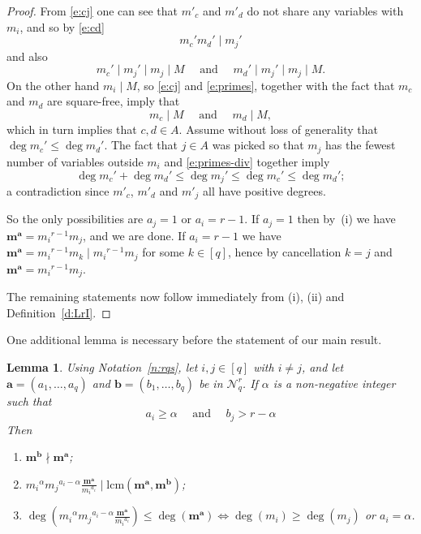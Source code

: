 \documentclass[11pt]{article}
\newtheorem{lemm}[theo]{Lemma}
\theoremstyle{definition}
\numberwithin{equation}{section}
\newcommand{\Nrq}{\mathcal{N}^r_q}
\newcommand{\lcm}{\mathrm{lcm}}
\newcommand{\ba}{\mathbf{a}}
\newcommand{\bb}{\mathbf{b}}
\newcommand{\bma}{\mathbf{m}^\ba}
\newcommand{\bmb}{\mathbf{m}^\bb}
\newcommand{\qand}{\quad \mbox{ and } \quad }
\begin{document}
\begin{proof}
From \eqref{e:cj} one can see that $m'_c$ and $m'_d$ do not share any variables with $m_i$, and so by \eqref{e:cd}
\begin{equation}\label{e:primes-div}
  m_c'm_d' \mid m_j' 
\end{equation} and also
\begin{equation}\label{e:primes}
  m_c' \mid m_j' \mid m_j \mid M \qand
  m_d' \mid m_j' \mid m_j \mid M.
\end{equation}
On the other hand $m_i \mid M$, so \eqref{e:cj} and \eqref{e:primes},
together with the fact that $m_c$ and $m_d$ are square-free, imply
that $$m_c \mid M \qand m_d \mid M,$$ which in turn implies that $c,d
\in A$. Assume without loss of generality that $\deg m_c' \leq \deg
m_d'$. The fact that $j \in A$ was picked so that $m_j$ has the fewest
number of variables outside $m_i$ and \eqref{e:primes-div} together
imply
$$  \deg m_c'+\deg m_d ' \leq
\deg m_j' \leq \deg m_c' \leq \deg m_d'; $$
a contradiction since $m'_c$, $m'_d$ and $m'_j$ all have positive degrees.


So the only possibilities are $a_j=1$ or $a_i=r-1$.  If $a_j=1$
then by~\textup{(}i\textup{)} we have $\bma ={m_i}^{r-1}m_j$, and we are done.  If
$a_i=r-1$ we have $\bma ={m_i}^{r-1}m_k \mid {m_i}^{r-1}m_j$ for some
$k \in [q]$, hence by cancellation $k=j$ and 
$\bma={m_i}^{r-1}{m_j}$.

The remaining statements now follow immediately from \textup{(}i\textup{)}, \textup{(}ii\textup{)} and
Definition~\ref{d:LrI}.
\end{proof}



One additional lemma is necessary before the
statement of our main result.

\begin{lemm}\label{l:non-div}
Using Notation~\ref{n:rqs}, let $i,j \in [q]$ with $i
\not = j$, and let $\ba=(a_1, \ldots, a_q)$ and $\bb=(b_1, \ldots,
b_q)$ be in $\Nrq$. If $\alpha$ is a non-negative integer such that
$$a_i \ge \alpha\qand b_j> r-\alpha
$$
Then
\begin{enumerate}[label=\textup{(}\roman*\textup{)}]
\item $\bmb \nmid \bma$;

\item ${m_i}^{\alpha}{m_j}^{a_i-\alpha}\frac{\bma}{{m_i}^{a_i}}\mid \lcm(\bma, \bmb)$;

\item $\deg({m_i}^{\alpha}{m_j}^{a_i-\alpha}\frac{\bma}{{m_i}^{a_i}}) \leq
  \deg(\bma) \iff \deg(m_i) \geq \deg (m_j)$ or $a_i=\alpha$.

\end{enumerate}
\end{lemm}
\end{document}
